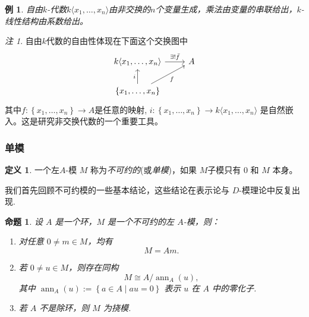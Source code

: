 \documentclass[11pt]{article}
\theoremstyle{plain}
\newtheorem{proposition}[theorem]{命题}
\newtheorem{example}[theorem]{例}
\theoremstyle{definition}
\newtheorem{definition}[theorem]{定义}
\theoremstyle{remark}
\newtheorem{remark}[theorem]{注}
\begin{document}
\begin{example}
    自由$k$-代数$k\langle x_1,\ldots,x_n\rangle$由非交换的$n$个变量生成，乘法由变量的串联给出，$k$-线性结构由系数给出。
\end{example}
\begin{remark}
    自由$k$代数的自由性体现在下面这个交换图中
    \begin{equation*}
        \begin{tikzcd}
            k\langle x_1,\ldots,x_n\rangle \arrow[r, "\exists!\bar{f}"] & A \\
            \{x_1,\ldots,x_n\} \arrow[u, "i"] \arrow[ur, "f"']
        \end{tikzcd}
    \end{equation*}
    其中$f:\left\{x_1,\ldots,x_n\right\}\to A$是任意的映射, $i:\left\{x_1,\ldots,x_n\right\}\rightarrow k\langle x_1,\ldots,x_n\rangle$ 是自然嵌入。这是研究非交换代数的一个重要工具。
\end{remark}

\subsubsection{单模}
\begin{definition}
    一个左$A$-模 $M$ 称为\emph{不可约的}(或\emph{单模})，如果 $M$子模只有 $0$ 和 $M$ 本身。
\end{definition}
我们首先回顾不可约模的一些基本结论，这些结论在表示论与
$D$-模理论中反复出现.
\begin{proposition}
    设 $A$ 是一个环，$M$ 是一个不可约的左 $A$-模，则：
    \begin{enumerate}[label=(\arabic*)]
        \item 对任意 $0 \neq m \in M$，均有
              \[
                  M = Am.
              \]
        \item 若 $0 \neq u \in M$，则存在同构
              \[
                  M \cong A / \operatorname{ann}_A(u),
              \]
              其中 $\operatorname{ann}_A(u):=\left\{a\in A\mid au=0\right\}$ 表示 $u$ 在 $A$ 中的零化子.
        \item 若 $A$ 不是除环，则 $M$ 为挠模.
    \end{enumerate}
\end{proposition}
\end{document}
